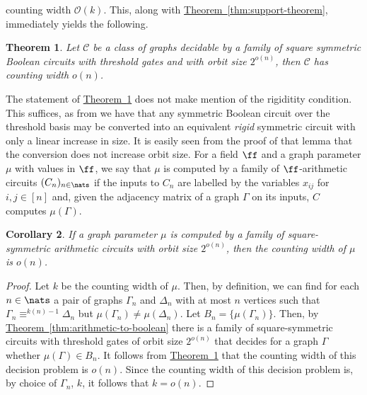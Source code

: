 \documentclass[11pt]{article}
\newcommand{\expref}[2]{\texorpdfstring{\hyperref[#2]{#1~\ref{#2}}}{#1~\ref{#2}}}
\newtheorem{theorem}{Theorem}[section]
\newtheorem{corollary}[theorem]{Corollary}
\begin{document}
counting width $\mathcal{O}(k)$. This, along with
\expref{Theorem}{thm:support-theorem}, immediately yields the following.
\begin{theorem}
  Let $\mathcal{C}$ be a class of graphs decidable by a family of square
  symmetric Boolean circuits with threshold gates and with orbit size $2^{o(n)}$, then
  $\mathcal{C}$ has counting width $o(n)$.
  \label{thm:cw-graphs}
\end{theorem}
The statement of \expref{Theorem}{thm:cw-graphs} does not make mention of the rigiditity condition. This suffices, as from \cite[Lemma~7]{AndersonD17} we have that any symmetric Boolean circuit over the threshold basis may be converted into an equivalent \emph{rigid} symmetric circuit with only a linear increase in size.  It is easily seen from the proof of that lemma that the conversion does not increase orbit size.
For a field $\ff$ and a graph parameter $\mu$ with values in $\ff$, we say that $\mu$ is computed by a family of $\ff$-arithmetic circuits $(C_n)_{n \in \nats}$ if the inputs to $C_n$ are labelled by the variables $x_{ij}$ for $i,j \in [n]$ and,  given the adjacency matrix of a graph $\Gamma$ on its inputs, $C$ computes $\mu(\Gamma)$.
\begin{corollary}
  If a graph parameter $\mu$ is computed by a
%
family of square-symmetric %
arithmetic circuits with orbit size $2^{o(n)}$,
then the counting width of $\mu$ is $o(n)$.
  \label{cor:arithmetic-supports-square}
\end{corollary}
\begin{proof}
  Let $k$ be the counting width of $\mu$.  Then, by definition, we can find for each $n \in  \nats$ a pair of graphs $\Gamma_n$ and $\Delta_n$ with at most $n$ vertices such that
  $\Gamma_n \equiv^{k(n) - 1} \Delta_n$ but $\mu (\Gamma_n) \neq \mu(\Delta_n)$.  Let $B_n =
  \{\mu(\Gamma_n)\}$.  Then, by \expref{Theorem}{thm:arithmetic-to-boolean}  there 
is a family of
  square-symmetric circuits with threshold gates of orbit size $2^{o(n)}$
  that decides for a graph $\Gamma$
  whether $\mu (\Gamma) \in B_n$.   It follows from \expref{Theorem}{thm:cw-graphs} that
  the counting width of this decision problem is $o(n)$.  Since the counting
  width of this decision problem is, by choice of $\Gamma_n$, $k$, it follows that
  $k = o(n)$.
\end{proof}
\end{document}
